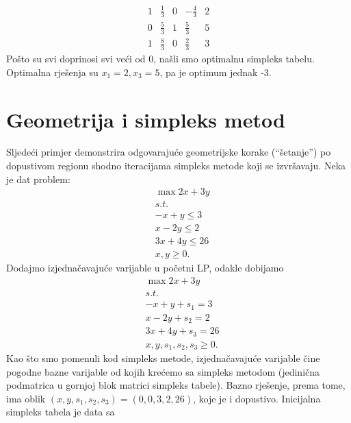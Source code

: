 \documentclass[a4paper, utf8, 11pt, colorlinks]{book}
\begin{document}
$$ \begin{array}{cccc|c}
       1   & \frac{1}{3}       & 0             &   -\frac{4}{3}             &   2  \\
       0   & \frac{5}{3}       & 1	           & \frac{5}{3}                 &   5 \\ \hline
       1   & \frac{8}{3}       & 0             &  \frac{2}{3}               &   3  
   \end{array}
 $$
Pošto su svi doprinosi svi veći od 0,  našli smo optimalnu simpleks tabelu.  Optimalna rješenja su 
 $x_1=2, x_3=5$, pa je  optimum jednak -3.
 
 \section{Geometrija i simpleks metod}
 
Sljedeći primjer demonstrira odgovarajuće geometrijske korake (``šetanje'') po dopustivom regionu shodno iteracijama simpleks metode koji se izvršavaju.   %
 Neka je dat problem:
 \begin{align*}
 	&\max 2x + 3y \\
 	& s.t. \\
 	& -x + y \leq 3 \\
 	& x - 2y \leq 2 \\
 	& 3x + 4y \leq 26 \\
 	& x, y \geq 0.
 \end{align*}
 Dodajmo izjednačavajuće varijable u početni LP, odakle dobijamo 
  \begin{align*}
 	&\max 2x + 3y \\
 	& s.t. \\
 	& -x + y + s_1 = 3 \\
 	& x - 2y + s_2 = 2 \\
 	& 3x + 4y + s_3 =  26 \\
 	& x, y, s_1, s_2, s_3 \geq 0.
 \end{align*}
Kao što smo pomenuli kod simpleks metode, 
izjednačavajuće varijable čine pogodne bazne varijable od kojih krećemo 
sa simpleks metodom (jedinična podmatrica u gornjoj blok matrici 
simpleks tabele). Bazno rješenje, prema tome, ima oblik 
$(x, y, s_1, s_2, s_3) = (0, 0, 3, 2, 26)$, koje je i dopustivo. Inicijalna simpleks 
tabela je data sa
\end{document}
